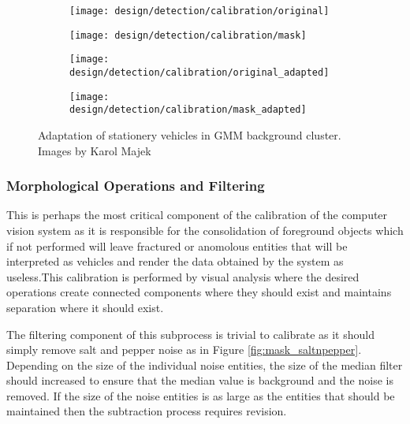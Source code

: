 \begin{figure}[H]
	\centering
	\begin{subfigure}[b]{0.5\linewidth}
        \centering\texttt{[image: design/detection/calibration/original]}
        \caption{}
        \label{fig:}
    \end{subfigure}%
    \begin{subfigure}[b]{0.5\linewidth}
        \centering\texttt{[image: design/detection/calibration/mask]}
        \caption{}
        \label{fig:}
    \end{subfigure}
    \begin{subfigure}[b]{0.5\linewidth}
        \centering\texttt{[image: design/detection/calibration/original\_adapted]}
        \caption{}
		\label{fig:}
    \end{subfigure}%
    	\begin{subfigure}[b]{0.5\linewidth}
        \centering\texttt{[image: design/detection/calibration/mask\_adapted]}
        \caption{}
        \label{fig:}
    \end{subfigure}
    \caption{Adaptation of stationery vehicles in GMM background cluster. Images by Karol Majek}
    \label{fig:cluster_adaptation}
\end{figure}



\subsubsection{Morphological Operations and Filtering}

This is perhaps the most critical component of the calibration of the computer vision system as it is responsible for the consolidation of foreground objects which if not performed will leave fractured or anomolous entities that will be interpreted as vehicles and render the data obtained by the system as useless.This calibration is performed by visual analysis where the desired operations create connected components where they should exist and maintains separation where it should exist. 

The filtering component of this subprocess is trivial to calibrate as it should simply remove salt and pepper noise as in Figure \ref{fig:mask_saltnpepper}. Depending on the size of the individual noise entities, the size of the median filter should increased to ensure that the median value is background and the noise is removed. If the size of the noise entities is as large as the entities that should be maintained then the subtraction process requires revision. 

